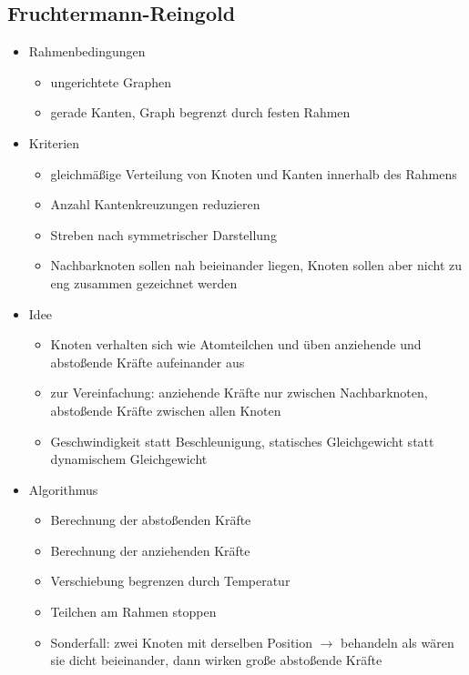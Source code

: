 \documentclass[a4paper,12pt,ngerman]{scrartcl}
\begin{document}
\subsection*{Fruchtermann-Reingold}
\begin{itemize}
    \item Rahmenbedingungen
    \begin{itemize}
        \item ungerichtete Graphen
        \item gerade Kanten, Graph begrenzt durch festen Rahmen
    \end{itemize}
    \item Kriterien
    \begin{itemize}
        \item gleichmäßige Verteilung von Knoten und Kanten innerhalb des Rahmens
        \item Anzahl Kantenkreuzungen reduzieren
        \item Streben nach symmetrischer Darstellung
        \item Nachbarknoten sollen nah beieinander liegen, Knoten sollen aber nicht zu eng zusammen gezeichnet werden
    \end{itemize}
    \item Idee
    \begin{itemize}
        \item Knoten verhalten sich wie Atomteilchen und üben anziehende und abstoßende Kräfte aufeinander aus
        \item zur Vereinfachung: anziehende Kräfte nur zwischen Nachbarknoten, abstoßende Kräfte zwischen allen Knoten
        \item Geschwindigkeit statt Beschleunigung, statisches Gleichgewicht statt dynamischem Gleichgewicht
    \end{itemize}
    \item Algorithmus
    \begin{itemize}
        \item Berechnung der abstoßenden Kräfte
        \item Berechnung der anziehenden Kräfte
        \item Verschiebung begrenzen durch Temperatur
        \item Teilchen am Rahmen stoppen
        \item Sonderfall: zwei Knoten mit derselben Position $\rightarrow$ behandeln als wären sie dicht beieinander, dann wirken große abstoßende Kräfte
    \end{itemize}


\end{itemize}
\end{document}
